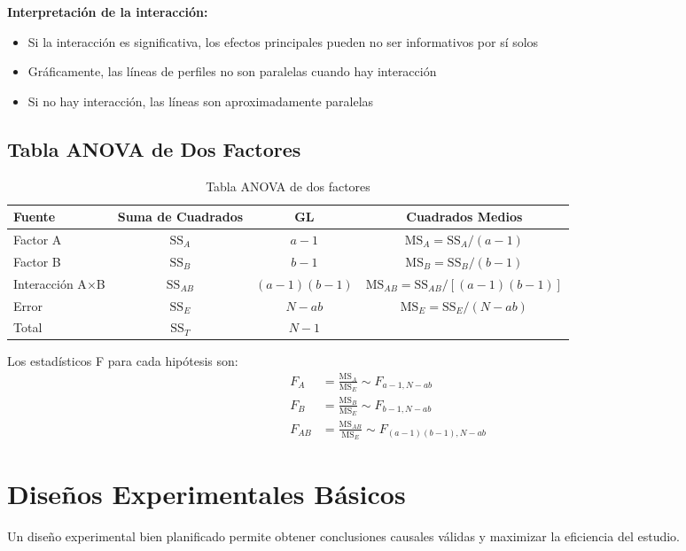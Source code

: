 \documentclass[11pt,a4paper]{article}
\theoremstyle{definition}
\begin{document}
\textbf{Interpretación de la interacción:}
\begin{itemize}
    \item Si la interacción es significativa, los efectos principales pueden no ser informativos por sí solos
    \item Gráficamente, las líneas de perfiles no son paralelas cuando hay interacción
    \item Si no hay interacción, las líneas son aproximadamente paralelas
\end{itemize}

\subsection{Tabla ANOVA de Dos Factores}

\begin{table}[H]
\centering
\small
\begin{tabular}{lccc}
\toprule
Fuente & Suma de Cuadrados & GL & Cuadrados Medios \\
\midrule
Factor A & $\text{SS}_A$ & $a-1$ & $\text{MS}_A = \text{SS}_A/(a-1)$ \\
Factor B & $\text{SS}_B$ & $b-1$ & $\text{MS}_B = \text{SS}_B/(b-1)$ \\
Interacción A$\times$B & $\text{SS}_{AB}$ & $(a-1)(b-1)$ & $\text{MS}_{AB} = \text{SS}_{AB}/[(a-1)(b-1)]$ \\
Error & $\text{SS}_E$ & $N-ab$ & $\text{MS}_E = \text{SS}_E/(N-ab)$ \\
Total & $\text{SS}_T$ & $N-1$ & \\
\bottomrule
\end{tabular}
\caption{Tabla ANOVA de dos factores}
\end{table}

Los estadísticos F para cada hipótesis son:
\begin{align*}
F_A &= \frac{\text{MS}_A}{\text{MS}_E} \sim F_{a-1, N-ab} \\
F_B &= \frac{\text{MS}_B}{\text{MS}_E} \sim F_{b-1, N-ab} \\
F_{AB} &= \frac{\text{MS}_{AB}}{\text{MS}_E} \sim F_{(a-1)(b-1), N-ab}
\end{align*}

\section{Diseños Experimentales Básicos}

Un diseño experimental bien planificado permite obtener conclusiones causales válidas y maximizar la eficiencia del estudio.
\end{document}
